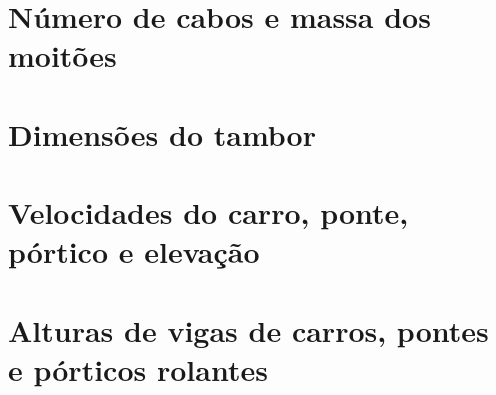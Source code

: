 \section{Número de cabos e massa dos moitões}


\section{Dimensões do tambor}


\section{Velocidades do carro, ponte, pórtico e elevação}


\section{Alturas de vigas de carros, pontes e pórticos rolantes}

